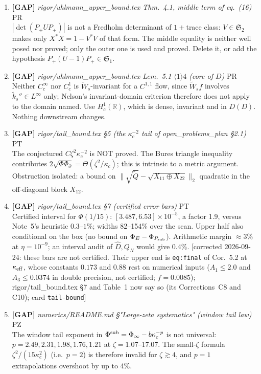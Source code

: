 \documentclass[11pt]{article}
\begin{document}
\begin{enumerate}[leftmargin=1.6em,itemsep=6pt]
\item \textbf{[GAP]} \emph{rigor/uhlmann\_upper\_bound.tex Thm.~4.1, middle term of eq.~(16)} \hfill\textsc{PR}\\ \(|\det(P_+UP_+)|\) is not a Fredholm determinant of \(1+\)trace class: \(V\in\mathfrak S_2\) makes only \(X^*X=1-V^*V\) of that form. The middle equality is neither well posed nor proved; only the outer one is used and proved. Delete it, or add the hypothesis \(P_+(U-1)P_+\in\mathfrak S_1\).
\item \textbf{[GAP]} \emph{rigor/uhlmann\_upper\_bound.tex Lem.~5.1 \(\langle1\rangle4\) (core of \(D\))} \hfill\textsc{PR}\\ Neither \(C_c^\infty\) nor \(C_c^1\) is \(\widetilde W_s\)-invariant for a \(C^{1,1}\) flow, since \(\widetilde W_sf\) involves \(\widetilde k_s''\in L^\infty\) only; Nelson's invariant-domain criterion therefore does not apply to the domain named. Use \(H^1_c(\mathbb R)\), which is dense, invariant and in \(D(D)\). Nothing downstream changes.
\item \textbf{[GAP]} \emph{rigor/tail\_bound.tex \S5 (the \(\kappa_c^{-2}\) tail of open\_problems\_plan \S2.1)} \hfill\textsc{PT}\\ The conjectured \(C\zeta^2\kappa_c^{-2}\) is NOT proved. The Bures triangle inequality contributes \(2\sqrt{\Phi\Phi_\partial}=\Theta(\zeta^2/\kappa_c)\); this is intrinsic to a metric argument. Obstruction isolated: a bound on \(\|\sqrt{\widetilde Q}-\sqrt{X_{11}\oplus X_{22}}\|_2\) quadratic in the off-diagonal block \(X_{12}\).
\item \textbf{[GAP]} \emph{rigor/tail\_bound.tex \S7 (certified error bars)} \hfill\textsc{PT}\\ Certified interval for \(\Phi(1/15)\): \([3.487,6.53]\times10^{-5}\), a factor 1.9, versus Note~5's heuristic \(0.3\)--\(1\%\); widths 82--154\% over the scan. Upper half also conditional on the box (no bound on \(\Phi_E-\Phi_{P_{\rm sub}}\)). Arithmetic margin \(\approx3\%\) at \(\eta=10^{-9}\); an interval audit of \(\widehat D,Q_N\) would give \(0.4\%\). [corrected 2026-09-24: these bars are not certified. Their upper end is \texttt{eq:final} of Cor.~5.2 at \(\kappa_{\rm eff}\), whose constants \(0.173\) and \(0.88\) rest on numerical inputs (\(A_1\le2.0\) and \(A_3\le0.0374\) in double precision, not certified; \(f=0.0085\)); rigor/tail\_bound.tex \S7 and Table~1 now say so (its Corrections~C8 and C10); card \texttt{tail-bound}]
\item \textbf{[GAP]} \emph{numerics/README.md \S"Large-zeta systematics" (window tail law)} \hfill\textsc{PZ}\\ The window tail exponent in \(\Phi^{\rm sub}=\Phi_\infty-b\kappa_c^{-p}\) is not universal: \(p=2.49,2.31,1.98,1.76,1.21\) at \(\zeta=1.07\)--\(17.07\). The small-\(\zeta\) formula \(\zeta^2/(15\kappa_c^2)\) (i.e.\ \(p=2\)) is therefore invalid for \(\zeta\gtrsim4\), and \(p=1\) extrapolations overshoot by up to 4\%.

\end{enumerate}
\end{document}
